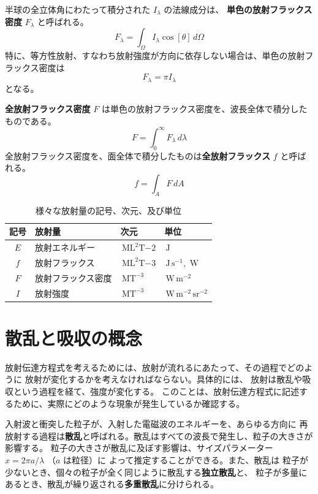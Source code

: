 \documentclass[article,twoside]{dennou777}
\newcommand{\Unit}[1]{\,\mathrm{#1}}
\newcommand{\hmemph}[1]{\textbf{#1}}
\begin{document}
半球の全立体角にわたって積分された $I_\lambda$ の法線成分は、
\hmemph{単色の放射フラックス密度} $F_\lambda$ と呼ばれる。
\begin{equation}
	F_\lambda=\int_\Omega I_\lambda\cos[\theta]\,d\Omega
\end{equation}
特に、等方性放射、すなわち放射強度が方向に依存しない場合は、単色の放射フラックス密度は
\begin{equation}
	F_\lambda=\pi I_\lambda
\end{equation}
となる。

\hmemph{全放射フラックス密度} $F$ は単色の放射フラックス密度を、波長全体で積分したものである。
\begin{equation}
	F=\int^\infty_0 F_\lambda\,d\lambda
\end{equation}
全放射フラックス密度を、面全体で積分したものは\hmemph{全放射フラックス} $f$ と呼ばれる。
\begin{equation}
	f=\int_AF\,dA
\end{equation}

\begin{table}[t]
	\caption{様々な放射量の記号、次元、及び単位}
	\centering
	\begin{tabular}{clll}
		\hline
		記号&放射量&次元&単位\\
		\hline\hline
		$E$&放射エネルギー&$\Unit{ML^2T{-2}}$&$\Unit{J}$\\
		$f$&放射フラックス&$\Unit{ML^2T{-3}}$&$\Unit{J\,s^{-1}}$, $\Unit{W}$\\
		$F$&放射フラックス密度&$\Unit{MT^{-3}}$&$\Unit{W\,m^{-2}}$\\
		$I$&放射強度&$\Unit{MT^{-3}}$&$\Unit{W\,m^{-2}\,sr^{-2}}$\\
		\hline
	\end{tabular}
\end{table}

\section{散乱と吸収の概念}
放射伝達方程式を考えるためには、放射が流れるにあたって、その過程でどのように
放射が変化するかを考えなければならない。具体的には、
放射は散乱や吸収という過程を経て、強度が変化する。
このことは、放射伝達方程式に記述するために、実際にどのような現象が発生しているか確認する。

入射波と衝突した粒子が、入射した電磁波のエネルギーを、あらゆる方向に
再放射する過程は\hmemph{散乱}と呼ばれる。散乱はすべての波長で発生し、粒子の大きさが影響する。
粒子の大きさが散乱に及ぼす影響は、サイズパラメーター $x=2\pi a/\lambda$ （$a$ は粒径）に
よって推定することができる。また、散乱は
粒子が少ないとき、個々の粒子が全く同じように散乱する\hmemph{独立散乱}と、
粒子が多量にあるとき、散乱が繰り返される\hmemph{多重散乱}に分けられる。
\end{document}
